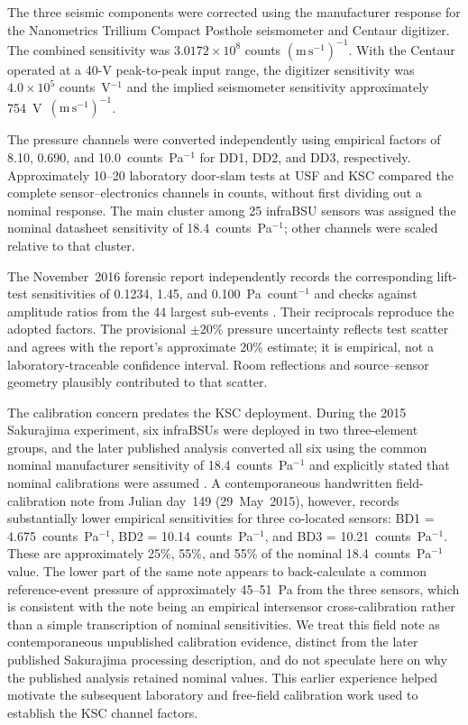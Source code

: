 \documentclass[]{seismica}
\begin{document}
The three seismic components were corrected using the manufacturer response
for the Nanometrics Trillium Compact Posthole seismometer and Centaur digitizer.
The combined sensitivity was $3.0172\times10^8$ counts
$(\mathrm{m\,s^{-1}})^{-1}$. With the Centaur operated at a 40-V peak-to-peak
input range, the digitizer sensitivity was $4.0\times10^5$ counts~V$^{-1}$ and
the implied seismometer sensitivity approximately
754~V~$(\mathrm{m\,s^{-1}})^{-1}$.

The pressure channels were converted independently using empirical factors of
8.10, 0.690, and 10.0~counts~Pa$^{-1}$ for DD1, DD2, and DD3, respectively.
Approximately 10--20 laboratory door-slam tests at USF and KSC compared the
complete sensor--electronics channels in counts, without first dividing out a
nominal response. The main cluster among 25 infraBSU sensors was assigned the
nominal datasheet sensitivity of 18.4~counts~Pa$^{-1}$; other channels were
scaled relative to that cluster.

The November~2016 forensic report independently records the corresponding
lift-test sensitivities of 0.1234, 1.45, and 0.100~Pa~count$^{-1}$ and checks
against amplitude ratios from the 44 largest sub-events
\citep{thompson_mcnutt_fireball_2016}. Their reciprocals reproduce the adopted
factors. The provisional $\pm20\%$ pressure uncertainty reflects test scatter
and agrees with the report's approximate 20\% estimate; it is empirical,
not a laboratory-traceable confidence interval. Room reflections and
source--sensor geometry plausibly contributed to that scatter.

The calibration concern predates the KSC deployment. During the 2015
Sakurajima experiment, six infraBSUs were deployed in two three-element groups,
and the later published analysis converted all six using the common nominal
manufacturer sensitivity of 18.4~counts~Pa$^{-1}$ and explicitly stated that
nominal calibrations were assumed \citep{smith_sakurajima_2020}. A
contemporaneous handwritten field-calibration note from Julian day~149
(29~May~2015), however, records substantially lower empirical sensitivities for
three co-located sensors: BD1 = 4.675~counts~Pa$^{-1}$,
BD2 = 10.14~counts~Pa$^{-1}$, and BD3 = 10.21~counts~Pa$^{-1}$. These are
approximately 25\%, 55\%, and 55\% of the nominal 18.4~counts~Pa$^{-1}$
value. The lower part of the same note appears to back-calculate a common
reference-event pressure of approximately 45--51~Pa from the three sensors,
which is consistent with the note being an empirical intersensor
cross-calibration rather than a simple transcription of nominal sensitivities.
We treat this field note as contemporaneous unpublished calibration evidence,
distinct from the later published Sakurajima processing description, and do
not speculate here on why the published analysis retained nominal values.
This earlier experience helped motivate the subsequent laboratory and
free-field calibration work used to establish the KSC channel factors.
\end{document}
